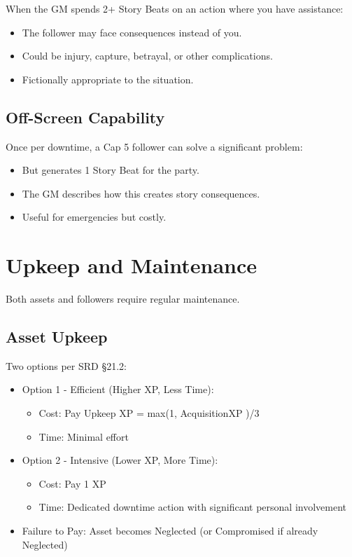 \documentclass[11pt,twoside,openany]{book}
\begin{document}
When the GM spends 2+ Story Beats on an action where you have assistance:
\begin{itemize}
\item The follower may face consequences instead of you.
\item Could be injury, capture, betrayal, or other complications.
\item Fictionally appropriate to the situation.
\end{itemize}

\subsection*{Off-Screen Capability}

Once per downtime, a Cap 5 follower can solve a significant problem:
\begin{itemize}
\item But generates 1 Story Beat for the party.
\item The GM describes how this creates story consequences.
\item Useful for emergencies but costly.
\end{itemize}

\section*{Upkeep and Maintenance} 

Both assets and followers require regular maintenance.

\subsection*{Asset Upkeep}

Two options per SRD §21.2:
\begin{itemize}
\item Option 1 - Efficient (Higher XP, Less Time):
\begin{itemize}
\item Cost: Pay Upkeep XP = max(1, AcquisitionXP )/3
\item Time: Minimal effort
\end{itemize}
\item Option 2 - Intensive (Lower XP, More Time):
\begin{itemize}
\item Cost: Pay 1 XP
\item Time: Dedicated downtime action with significant personal involvement
\end{itemize}
\item Failure to Pay: Asset becomes Neglected (or Compromised if already Neglected)
\end{itemize}
\end{document}
